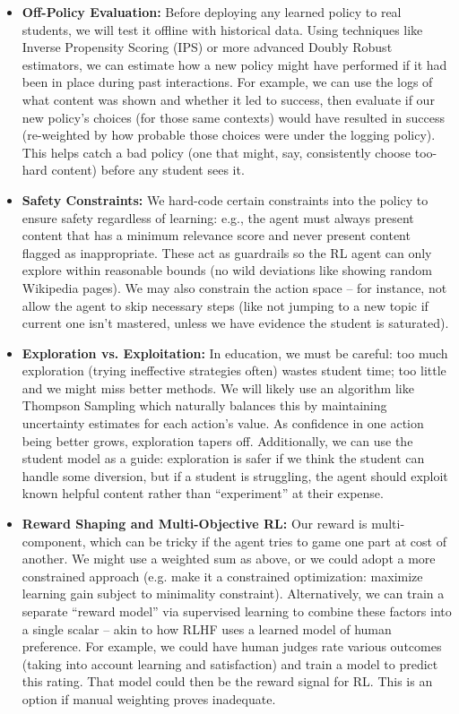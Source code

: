 \documentclass[11pt]{article}
\begin{document}
\begin{itemize}
  \item \textbf{Off-Policy Evaluation:} Before deploying any learned policy to real students, we will test it offline with historical data. Using techniques like Inverse Propensity Scoring (IPS) or more advanced Doubly Robust estimators, we can estimate how a new policy might have performed if it had been in place during past interactions. For example, we can use the logs of what content was shown and whether it led to success, then evaluate if our new policy’s choices (for those same contexts) would have resulted in success (re-weighted by how probable those choices were under the logging policy). This helps catch a bad policy (one that might, say, consistently choose too-hard content) before any student sees it.
  \item \textbf{Safety Constraints:} We hard-code certain constraints into the policy to ensure safety regardless of learning: e.g., the agent must always present content that has a minimum relevance score and never present content flagged as inappropriate. These act as guardrails so the RL agent can only explore within reasonable bounds (no wild deviations like showing random Wikipedia pages). We may also constrain the action space – for instance, not allow the agent to skip necessary steps (like not jumping to a new topic if current one isn’t mastered, unless we have evidence the student is saturated).
  \item \textbf{Exploration vs. Exploitation:} In education, we must be careful: too much exploration (trying ineffective strategies often) wastes student time; too little and we might miss better methods. We will likely use an algorithm like Thompson Sampling which naturally balances this by maintaining uncertainty estimates for each action’s value. As confidence in one action being better grows, exploration tapers off. Additionally, we can use the student model as a guide: exploration is safer if we think the student can handle some diversion, but if a student is struggling, the agent should exploit known helpful content rather than “experiment” at their expense.
  \item \textbf{Reward Shaping and Multi-Objective RL:} Our reward is multi-component, which can be tricky if the agent tries to game one part at cost of another. We might use a weighted sum as above, or we could adopt a more constrained approach (e.g. make it a constrained optimization: maximize learning gain subject to minimality constraint). Alternatively, we can train a separate “reward model” via supervised learning to combine these factors into a single scalar – akin to how RLHF uses a learned model of human preference. For example, we could have human judges rate various outcomes (taking into account learning and satisfaction) and train a model to predict this rating. That model could then be the reward signal for RL. This is an option if manual weighting proves inadequate.

\end{itemize}
\end{document}
